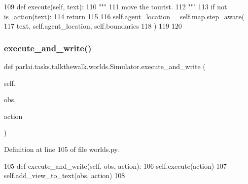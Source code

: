 \begin{DoxyCode}
109     \textcolor{keyword}{def }execute(self, text):
110         \textcolor{stringliteral}{"""}
111 \textcolor{stringliteral}{        move the tourist.}
112 \textcolor{stringliteral}{        """}
113         \textcolor{keywordflow}{if} \textcolor{keywordflow}{not} \hyperlink{namespaceparlai_1_1tasks_1_1talkthewalk_1_1worlds_aa28536df060005c301225d766f91cb13}{is\_action}(text):
114             \textcolor{keywordflow}{return}
115 
116         self.agent\_location = self.map.step\_aware(
117             text, self.agent\_location, self.boundaries
118         )
119 
120 
\end{DoxyCode}
\mbox{\label{classparlai_1_1tasks_1_1talkthewalk_1_1worlds_1_1Simulator_ae196cf0b53564026703d3ebbd4e741eb}} 
\subsubsection{\texorpdfstring{execute\+\_\+and\+\_\+write()}{execute\_and\_write()}}
{\footnotesize\ttfamily def parlai.\+tasks.\+talkthewalk.\+worlds.\+Simulator.\+execute\+\_\+and\+\_\+write (\begin{DoxyParamCaption}\item[{}]{self,  }\item[{}]{obs,  }\item[{}]{action }\end{DoxyParamCaption})}



Definition at line 105 of file worlds.\+py.


\begin{DoxyCode}
105     \textcolor{keyword}{def }execute\_and\_write(self, obs, action):
106         self.execute(action)
107         self.add\_view\_to\_text(obs, action)
108 
\end{DoxyCode}
\mbox{\label{classparlai_1_1tasks_1_1talkthewalk_1_1worlds_1_1Simulator_ae3cf085288804e12b1d8e70e22f1017e}} 
